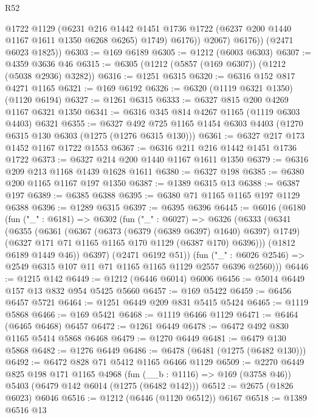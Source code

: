 \begin{lexlean}{R52}
\begin{coremodule}
                @1722
                @1129
                (@6231
                  @216
                  @1442
                  @1451
                  @1736
                  @1722
                  (@6237 @200 @1440 @1167 @1611 @1350 @6268 @6265)
                  @1749)
                @6176))
            @2067)
          @6176))
      (@2471 @6023 @1825))
@6303 := @169 @6189
@6305 := @1212 (@6003 @6303)
@6307 := @4359 @3636 @46
@6315 := @6305 (@1212 (@5857 (@169 @6307)) (@1212 (@5038 @2936) @3282))
@6316 := @1251 @6315
@6320 := @6316 @152 @817 @4271 @1165
@6321 := @169 @6192
@6326 := @6320 (@1119 @6321 @1350) (@1120 @6194)
@6327 := @1261 @6315
@6333 := @6327 @815 @200 @4269 @1167 @6321 @1350
@6341 := @6316 @345 @814 @4267 @1165 (@1119 @6303 @4403) @6321
@6355 := @6327 @492 @725 @1165 @1454 @6303 @4403 (@1270 @6315 @130 @6303 (@1275 (@1276 @6315 @130)))
@6361 := @6327 @217 @173 @1452 @1167 @1722 @1553
@6367 := @6316 @211 @216 @1442 @1451 @1736 @1722
@6373 := @6327 @214 @200 @1440 @1167 @1611 @1350
@6379 := @6316 @209 @213 @1168 @1439 @1628 @1611
@6380 := @6327 @198
@6385 := @6380 @200 @1165 @1167 @197 @1350
@6387 := @1389 @6315 @13
@6388 := @6387 @197
@6389 := @6385 @6388
@6395 := @6380 @71 @1165 @1165 @197 @1129 @6388
@6396 := @1289 @6315
@6397 := @6395 @6396
@6445 := @6016
    (@6180
      (fun ("_" : @6181) =>
      @6302
        (fun ("_" : @6027) =>
        @6326
          (@6333
            (@6341
              (@6355
                (@6361
                  (@6367 (@6373 (@6379 (@6389 @6397) @1640) @6397) @1749)
                  (@6327 @171 @71 @1165 @1165 @170 @1129 (@6387 @170) @6396)))
              (@1812 @6189 @1449 @46))
            @6397)
          (@2471 @6192 @51))
        (fun ("_" : @6026 @2546) => @2549 @6315 @107 @11 @71 @1165 @1165 @1129 @2557 @6396 @2560)))
@6446 := @1215 @142
@6449 := @1212 (@6446 @6014) @6006
@6456 := @5014 @6449 @157 @13 @832 @954 @5425 @5660
@6457 := @169 @5422
@6459 := @6456 @6457 @5721
@6464 := @1251 @6449 @209 @831 @5415 @5424
@6465 := @1119 @5868
@6466 := @169 @5421
@6468 := @1119 @6466 @1129
@6471 := @6464 (@6465 @6468) @6457
@6472 := @1261 @6449
@6478 := @6472 @492 @830 @1165 @5414 @5868 @6468
@6479 := @1270 @6449
@6481 := @6479 @130 @5868
@6482 := @1276 @6449
@6486 := @6478 (@6481 (@1275 (@6482 @130)))
@6492 := @6472 @828 @71 @5412 @1165 @6466 @1129
@6509 := @2270
    @6449
    @825
    @198
    @171
    @1165
    @4968
    (fun (__b : @1116) => @169 (@3758 @46))
    @5403
    (@6479 @142 @6014 (@1275 (@6482 @142)))
@6512 := @2675 (@1826 @6023) @6046
@6516 := @1212 (@6446 (@1120 @6512)) @6167
@6518 := @1389 @6516 @13

\end{coremodule}
\end{lexlean}
